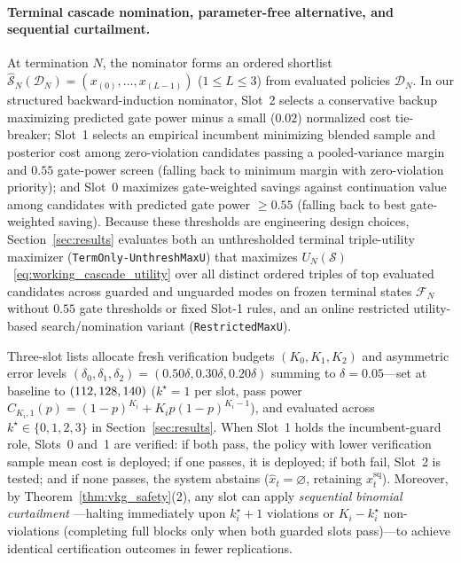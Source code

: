\paragraph{Terminal cascade nomination, parameter-free alternative, and sequential curtailment.}
At termination $N$, the nominator forms an ordered shortlist $\hat{\mathcal{S}}_N(\mathcal{D}_N) = (x_{(0)}, \dots, x_{(L-1)})$ ($1 \le L \le 3$) from evaluated policies $\mathcal{D}_N$. In our structured backward-induction nominator, Slot~2 selects a conservative backup maximizing predicted gate power minus a small ($0.02$) normalized cost tie-breaker; Slot~1 selects an empirical incumbent minimizing blended sample and posterior cost among zero-violation candidates passing a pooled-variance margin and $0.55$ gate-power screen (falling back to minimum margin with zero-violation priority); and Slot~0 maximizes gate-weighted savings against continuation value among candidates with predicted gate power $\ge 0.55$ (falling back to best gate-weighted saving). Because these thresholds are engineering design choices, Section~\ref{sec:results} evaluates both an unthresholded terminal triple-utility maximizer (\texttt{TermOnly-UnthreshMaxU}) that maximizes $U_N(\mathcal{S})$~\eqref{eq:working_cascade_utility} over all distinct ordered triples of top evaluated candidates across guarded and unguarded modes on frozen terminal states $\mathcal{F}_N$ without $0.55$ gate thresholds or fixed Slot-1 rules, and an online restricted utility-based search/nomination variant (\texttt{RestrictedMaxU}).

Three-slot lists allocate fresh verification budgets $(K_0, K_1, K_2)$ and asymmetric error levels $(\delta_0, \delta_1, \delta_2) = (0.50\delta, 0.30\delta, 0.20\delta)$ summing to $\delta = 0.05$—set at baseline to $(112, 128, 140)$ ($k^\star = 1$ per slot, pass power $C_{K_i,1}(p) = (1-p)^{K_i} + K_i p(1-p)^{K_i-1}$), and evaluated across $k^\star \in \{0, 1, 2, 3\}$ in Section~\ref{sec:results}. When Slot~1 holds the incumbent-guard role, Slots~0 and~1 are verified: if both pass, the policy with lower verification sample mean cost is deployed; if one passes, it is deployed; if both fail, Slot~2 is tested; and if none passes, the system abstains ($\hat{x}_t = \varnothing$, retaining $x_t^{\mathrm{sq}}$). Moreover, by Theorem~\ref{thm:vkg_safety}(2), any slot can apply \emph{sequential binomial curtailment} \citep{wald1945sequential,batur2010finding}—halting immediately upon $k_i^\star + 1$ violations or $K_i - k_i^\star$ non-violations (completing full blocks only when both guarded slots pass)—to achieve identical certification outcomes in fewer replications.

